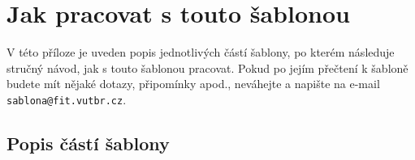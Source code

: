 
%






\chapter{Jak pracovat s touto šablonou}
\label{jak}

V této příloze je uveden popis jednotlivých částí šablony, po kterém následuje stručný návod, jak s touto šablonou pracovat. Pokud po jejím přečtení k šabloně budete mít nějaké dotazy, připomínky apod., neváhejte a napište na e-mail \texttt{sablona@fit.vutbr.cz}.

\section*{Popis částí šablony}

